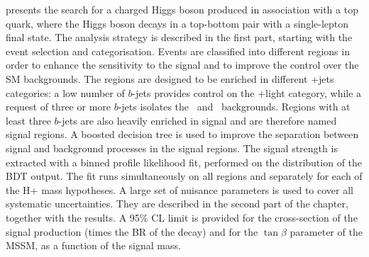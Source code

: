 presents the search for a charged Higgs boson produced in association with a top
quark, where the Higgs boson decays in a top-bottom pair with a single-lepton final state.
The analysis strategy is described in the first part, starting with  the event selection and
categorisation. Events are classified into different regions in order to enhance the sensitivity
to the signal and to improve the control over the SM backgrounds. The regions are designed
to be enriched in different \ttbar+jets categories: a low number of $b$-jets provides control on
the \ttbar+light category, while a request of three or more $b$-jets isolates the \ttc\ and
\ttb\ backgrounds. Regions with at least three $b$-jets are also heavily enriched in signal
and are therefore named signal regions. A boosted decision tree is used to improve the
separation between signal and background processes in the signal regions. The signal strength
is extracted with a binned profile likelihood fit, performed on the distribution of the BDT
output. The fit runs simultaneously on all regions and separately for each of the H+ mass
hypotheses. A large set of nuisance parameters is used to cover all systematic uncertainties.
They are described in the second part of the chapter, together with the results. A 95\% CL
limit is provided for the cross-section of the signal production (times the BR of the decay)
and for the $\tan\beta$ parameter of the MSSM, as a function of the signal mass. 






